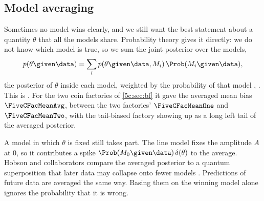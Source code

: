 \subsection{Model averaging}
\label{5c:sec:averaging}

Sometimes no model wins clearly, and we still want the best statement about a quantity
$\theta$ that all the models share. Probability theory gives it directly: we do not know
which model is true, so we sum the joint posterior over the models,
\begin{equation}
  p(\theta\given\data)=\sum_i p(\theta\given\data,M_i)\,\Prob(M_i\given\data),
  \label{5c:eq:bma}
\end{equation}
the posterior of $\theta$ inside each model, weighted by the probability of that model
, . This is . For the two coin factories of \cref{5c:sec:bf} it gave the averaged mean bias
$\FiveCFacMeanAvg$, between the two factories' $\FiveCFacMeanOne$ and
$\FiveCFacMeanTwo$, with the tail-biased factory showing up as a long left tail of the
averaged posterior.

A model in which $\theta$ is fixed still takes part. The line model fixes the amplitude
$A$ at $0$, so it contributes a spike $\Prob(M_0\given\data)\,\delta(\theta)$ to the
average. Hobson and collaborators compare the averaged posterior to a quantum
superposition that later data may collapse onto fewer models .
Predictions of future data are averaged the same way. Basing them on the winning model
alone ignores the probability that it is wrong.

